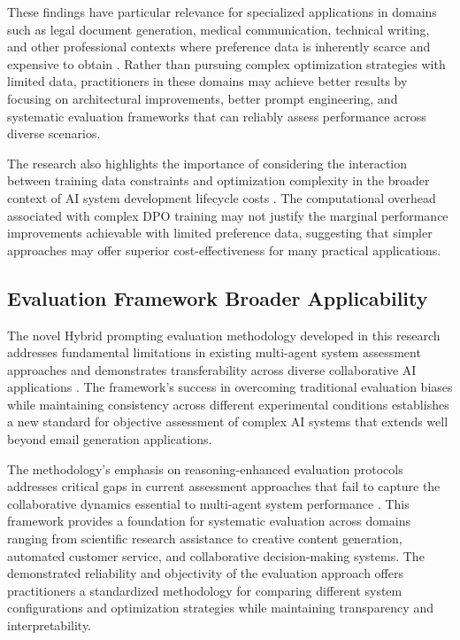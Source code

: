 These findings have particular relevance for specialized applications in domains such as legal document generation, medical communication, technical writing, and other professional contexts where preference data is inherently scarce and expensive to obtain \cite{bernard2024equator_deterministic}. Rather than pursuing complex optimization strategies with limited data, practitioners in these domains may achieve better results by focusing on architectural improvements, better prompt engineering, and systematic evaluation frameworks that can reliably assess performance across diverse scenarios.

The research also highlights the importance of considering the interaction between training data constraints and optimization complexity in the broader context of AI system development lifecycle costs \cite{zeng2023challenge_meta_reasoning}. The computational overhead associated with complex DPO training may not justify the marginal performance improvements achievable with limited preference data, suggesting that simpler approaches may offer superior cost-effectiveness for many practical applications.

\subsection{Evaluation Framework Broader Applicability}

The novel Hybrid prompting evaluation methodology developed in this research addresses fundamental limitations in existing multi-agent system assessment approaches and demonstrates transferability across diverse collaborative AI applications \cite{lee2025evaluating_reasoning_traces, patil2025advancing_reasoning_llm}. The framework's success in overcoming traditional evaluation biases while maintaining consistency across different experimental conditions establishes a new standard for objective assessment of complex AI systems that extends well beyond email generation applications.

The methodology's emphasis on reasoning-enhanced evaluation protocols addresses critical gaps in current assessment approaches that fail to capture the collaborative dynamics essential to multi-agent system performance \cite{xu2025contextual_judge_bench}. This framework provides a foundation for systematic evaluation across domains ranging from scientific research assistance to creative content generation, automated customer service, and collaborative decision-making systems. The demonstrated reliability and objectivity of the evaluation approach offers practitioners a standardized methodology for comparing different system configurations and optimization strategies while maintaining transparency and interpretability.

